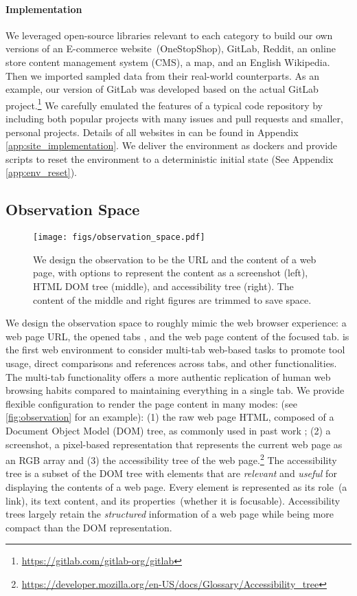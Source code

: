 \paragraph{Implementation} 
We leveraged open-source libraries relevant to each category to build our own versions of an E-commerce website~(OneStopShop), GitLab, Reddit, an online store content management system (CMS), a map, and an English Wikipedia. 
Then we imported sampled data from their real-world counterparts. %
As an example, our version of GitLab was developed based on the actual GitLab project.\footnote{\url{https://gitlab.com/gitlab-org/gitlab}} We carefully emulated the features of a typical code repository by including both popular projects with many issues and pull requests and smaller, personal projects.
Details of all websites in \ours can be found in Appendix \ref{app:site_implementation}.
We deliver the environment as dockers and provide scripts to reset the environment to a deterministic initial state (See Appendix \ref{app:env_reset}).

\subsection{Observation Space}\label{sec:observation}
\begin{figure}
    \vspace{-10mm}
    \centering
    \texttt{[image: figs/observation\_space.pdf]}
    \caption{We design the observation to be the URL and the content of a web page, with options to represent the content as a screenshot (left), HTML DOM tree (middle), and accessibility tree (right). The content of the middle and right figures are trimmed to save space.}
    \label{fig:observation}
    \vspace{-2mm}
\end{figure}
We design the observation space to roughly mimic the web browser experience: a web page URL, the opened tabs
, and the web page content of the focused tab. 
\ours is the first web environment to consider multi-tab web-based tasks to promote tool usage, direct comparisons and references across tabs, and other functionalities. 
The multi-tab functionality offers a more authentic replication of human web browsing habits compared to maintaining everything in a single tab.
We provide flexible configuration to render the page content in many modes: (see \autoref{fig:observation} for an example):
(1) the raw web page HTML, composed of a Document Object Model (DOM) tree, as commonly used in past work \citep{shi2017world,deng2023mind2web,li2020mapping}; (2) a screenshot, a pixel-based representation that represents the current web page as an RGB array and (3) the accessibility tree of the web page.\footnote{\url{https://developer.mozilla.org/en-US/docs/Glossary/Accessibility_tree}} 
The accessibility tree is a subset of the DOM tree with elements that are \emph{relevant} and \emph{useful} for displaying the contents of a web page.
Every element is represented as its role~(\eg a link), its text content, and its properties~(\eg whether it is focusable). 
Accessibility trees largely retain the \emph{structured} information of a web page while being more compact than the DOM representation.%

